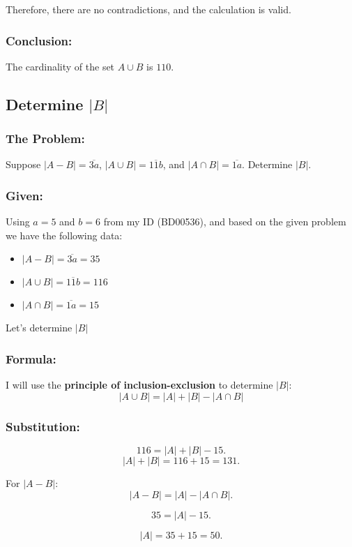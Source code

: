 \documentclass[12pt, a4paper, twoside]{report} %
\begin{document}
Therefore, there are no contradictions, and the calculation is valid.

\subsubsection*{Conclusion:}
The cardinality of the set \( A \cup B \) is $\boxed{110}$.


\subsection{Determine $| B |$}

\subsubsection*{The Problem:}
  Suppose $|A-B|=\overline{3a}$, $|A \cup B|=\overline {11b}$, and $|A \cap B|=\overline{1a}$. Determine $|B|$.

\subsubsection*{Given:}
  Using \(a = 5\) and \(b = 6\) from my ID (BD00536), and based on the given problem we have the following data:
  \begin{itemize}
    \item $\vert A - B \vert = \overline{3a} = 35$
    \item $\vert A \cup B \vert = \overline{11b} = 116$
    \item $\vert A \cap B \vert = \overline{1a} = 15$
  \end{itemize}
  Let's determine $|B|$

\subsubsection*{Formula:}
  I will use the \textbf{principle of inclusion-exclusion} to determine $|B|$:
    \[
    |A \cup B| = |A| + |B| - |A \cap B| \tag{1}
    \]

\subsubsection*{Substitution:}
  \[
  116 = |A| + |B| - 15.
  \]
  \[
  |A| + |B| = 116 + 15 = 131. \tag{2}
  \]

  For \( |A - B| \):
  \[
  |A - B| = |A| - |A \cap B|.
  \]

  \[
  35 = |A| - 15.
  \]

  \[
  |A| = 35 + 15 = 50.
  \]
\end{document}
